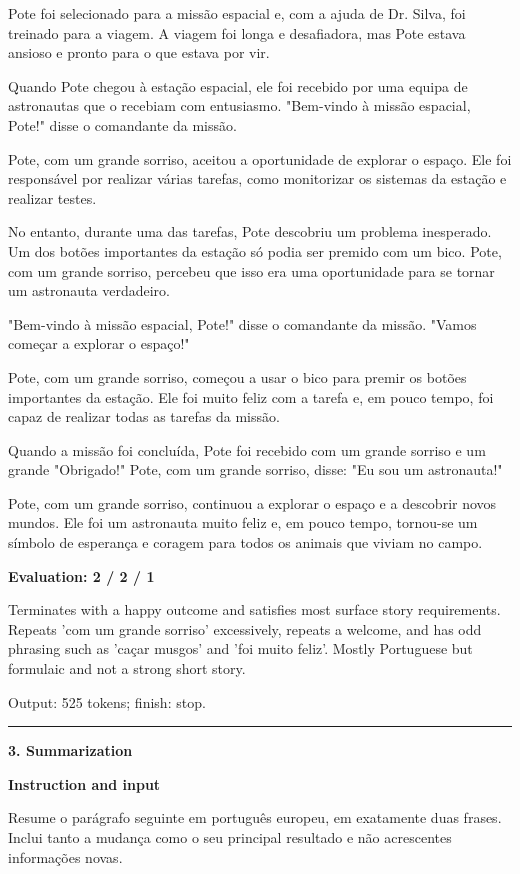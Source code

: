 \documentclass[10pt]{article}
\begin{document}
{\begin{minipage}{\textwidth}
Pote foi selecionado para a missão espacial e, com a ajuda de Dr. Silva, foi treinado para a viagem. A viagem foi longa e desafiadora, mas Pote estava ansioso e pronto para o que estava por vir.
\par\smallskip
Quando Pote chegou à estação espacial, ele foi recebido por uma equipa de astronautas que o recebiam com entusiasmo. "Bem-vindo à missão espacial, Pote!" disse o comandante da missão.
\par\smallskip
Pote, com um grande sorriso, aceitou a oportunidade de explorar o espaço. Ele foi responsável por realizar várias tarefas, como monitorizar os sistemas da estação e realizar testes.
\par\smallskip
No entanto, durante uma das tarefas, Pote descobriu um problema inesperado. Um dos botões importantes da estação só podia ser premido com um bico. Pote, com um grande sorriso, percebeu que isso era uma oportunidade para se tornar um astronauta verdadeiro.
\par\smallskip
"Bem-vindo à missão espacial, Pote!" disse o comandante da missão. "Vamos começar a explorar o espaço!"
\par\smallskip
Pote, com um grande sorriso, começou a usar o bico para premir os botões importantes da estação. Ele foi muito feliz com a tarefa e, em pouco tempo, foi capaz de realizar todas as tarefas da missão.
\par\smallskip
Quando a missão foi concluída, Pote foi recebido com um grande sorriso e um grande "Obrigado!" Pote, com um grande sorriso, disse: "Eu sou um astronauta!"
\par\smallskip
Pote, com um grande sorriso, continuou a explorar o espaço e a descobrir novos mundos. Ele foi um astronauta muito feliz e, em pouco tempo, tornou-se um símbolo de esperança e coragem para todos os animais que viviam no campo.\par\smallskip
\textbf{Evaluation: 2 / 2 / 1}\par Terminates with a happy outcome and satisfies most surface story requirements. Repeats 'com um grande sorriso' excessively, repeats a welcome, and has odd phrasing such as 'caçar musgos' and 'foi muito feliz'. Mostly Portuguese but formulaic and not a strong short story.
\par {\color{gray} Output: 525 tokens; finish: stop.}\par
\medskip\hrule\smallskip
{\bfseries 3. Summarization}\par\smallskip
\textbf{Instruction and input}\par Resume o parágrafo seguinte em português europeu, em exatamente duas frases. Inclui tanto a mudança como o seu principal resultado e não acrescentes informações novas.

\end{minipage}}
\end{document}
